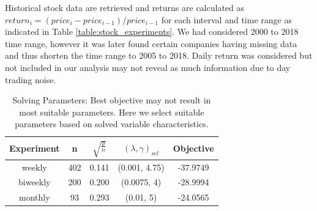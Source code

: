 \documentclass[10pt,conference]{IEEEtran}
\begin{document}
Historical stock data are retrieved and returns are calculated as $return_i = (price_{i}-price_{i-1})/price_{i-1}$ for each interval and time range as indicated in Table \ref{table:stock_experiments}. We had considered 2000 to 2018 time range, however it was later found certain companies having missing data and thus shorten the time range to 2005 to 2018. Daily return was considered but not included in our analysis may not reveal as much information due to day trading noise.
\begin{table}[h]
    \centering
    \begin{tabular}{|c|c|c|c|c|}\hline
         Experiment & n & $\sqrt{\frac{p}{n}}$ & $(\lambda,\gamma)_{sel}$ & Objective\\\hline
         weekly & 402 & 0.141 & (0.001, 4.75) & -37.9749 \\ \hline
         biweekly & 200 & 0.200 &(0.0075, 4) & -28.9994 \\ \hline
         monthly  & 93 & 0.293 & (0.01, 5) & -24.0565\\ \hline
    \end{tabular}
    \caption{Solving Parameters: Best objective may not result in most suitable parameters. Here we select suitable parameters based on solved variable characteristics.}
    \label{table:solve_parameters}
\end{table}
\end{document}
